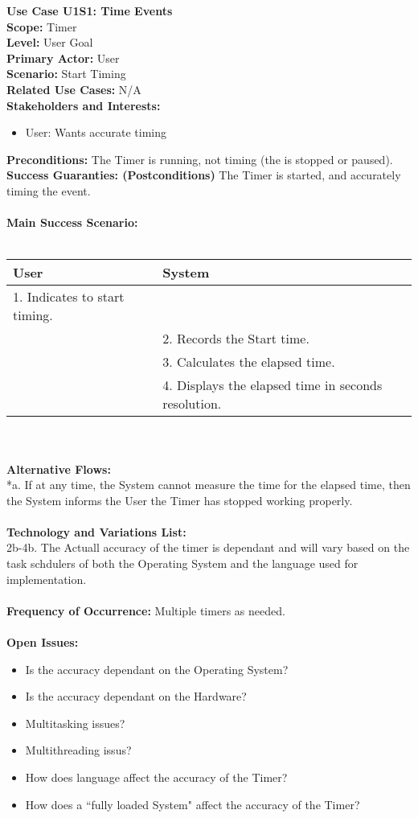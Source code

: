 \documentclass[letterpaper]{article}
\begin{document}
\noindent
\textbf{Use Case U1S1:  Time Events}\\
\textbf{Scope:  }Timer\\
\textbf{Level:  }User Goal\\
\textbf{Primary Actor:  }User\\
\textbf{Scenario:  }Start Timing\\
\textbf{Related Use Cases:  }N/A\\
\textbf{Stakeholders and Interests:}
\begin{itemize}
\item User:  Wants accurate timing
\end{itemize}
\textbf{Preconditions:  }The Timer is running, not timing (the
is stopped or paused).\\
\textbf{Success Guaranties:  (Postconditions)} 
The Timer is started, and accurately timing the event.\\\\
\textbf{Main Success Scenario: }\\\\
\begin{tabular}{|p{6cm}|p{6cm}|}\hline
\textbf{User} & \textbf{System}\\\hline
1.  Indicates to start timing. & \\\hline
&2.  Records the Start time.\\\hline
&3.  Calculates the elapsed time.\\\hline
&4.  Displays the elapsed time in seconds resolution.\\\hline
\end{tabular}\\\\
\textbf{Alternative Flows:  }\\
*a.  If at any time, the System cannot measure the time for the
elapsed time, then the System informs the User the Timer has
stopped working properly.\\\\
\textbf{Technology and Variations List:  }\\
2b-4b.  The Actuall accuracy of the timer is dependant and
will vary based on the task schdulers of both the Operating
System and the language used for implementation.\\\\
\textbf{Frequency of Occurrence:  }Multiple timers as needed.\\\\
\textbf{Open Issues:  }\\
\begin{itemize}
\item Is the accuracy dependant on the Operating System?
\item Is the accuracy dependant on the Hardware?
\item Multitasking issues?
\item Multithreading issus?
\item How does language affect the accuracy of the Timer?
\item How does a ``fully loaded System" affect the accuracy
of the Timer?
\end{itemize}
\end{document}
